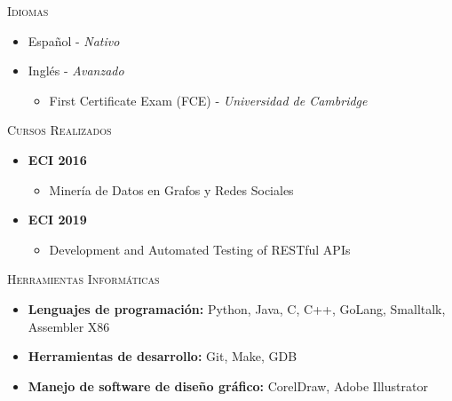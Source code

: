 \textsc{Idiomas}
\begin{itemize}
    \item Español - \textit{Nativo}
    \item Inglés - \textit{Avanzado}
    \begin{itemize}
        \item First Certificate Exam (FCE) - \textit{Universidad de Cambridge}
    \end{itemize}
\end{itemize}

\textsc{Cursos Realizados}
\begin{itemize}
    \item \textbf{ECI 2016} 
        \begin{itemize}
            \item Minería de Datos en Grafos y Redes Sociales
        \end{itemize}
    \item \textbf{ECI 2019} 
        \begin{itemize}
            \item Development and Automated Testing of RESTful APIs
        \end{itemize}
\end{itemize}

\textsc{Herramientas Informáticas}
\begin{itemize}
    \item \textbf{Lenguajes de programación: } Python, Java, C, C++, GoLang, Smalltalk, Assembler X86
    \item \textbf{Herramientas de desarrollo: } Git, Make, GDB
    \item \textbf{Manejo de software de diseño gráfico: } CorelDraw, Adobe Illustrator
\end{itemize}
